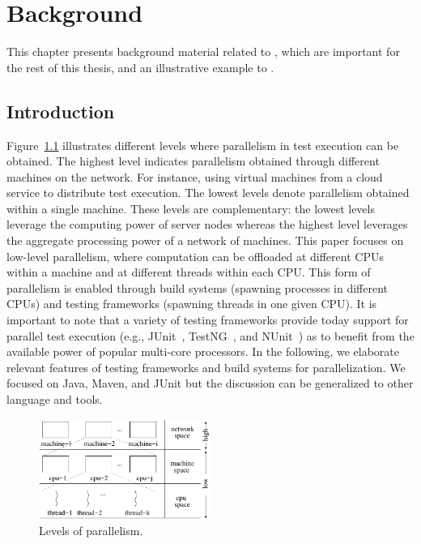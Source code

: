 \chapter{Background}
\label{sec:modes}

This chapter presents background material related to , which are
important for the rest of this thesis, and an illustrative example to
.

\section{Introduction}

Figure~\ref{fig:levels} illustrates different levels where
parallelism in test execution can be obtained.
The highest level indicates
parallelism obtained through different machines on the
network.  For instance, using virtual machines from a cloud service to
distribute test execution.  The lowest levels denote parallelism
obtained within a single machine.  These levels are complementary:
the lowest levels leverage the computing power of server
nodes whereas the highest level leverages the aggregate processing
power of a network of machines.
This paper focuses on low-level parallelism, where computation can be
offloaded at different CPUs within a machine and at different threads
within each CPU.  This form of parallelism is enabled through build
systems (spawning processes in different CPUs) and testing frameworks
(spawning threads in one given CPU).  It is important to note that a variety
of testing frameworks provide today support for parallel test
execution (e.g., JUnit~\cite{junit-org}, TestNG~\cite{testng}, and
NUnit~\cite{nunit}) as to benefit from the available power of popular multi-core processors.
In the following, we elaborate relevant features of testing frameworks
and build systems for parallelization.  We focused on Java, Maven, and JUnit but the
discussion can be generalized to other language and tools.

\begin{figure}[h!]
  \centering
  \includegraphics[width=0.5\textwidth]{figs/parallel-levels.pdf}    
  \caption{\label{fig:levels}Levels of parallelism.}
\end{figure}

